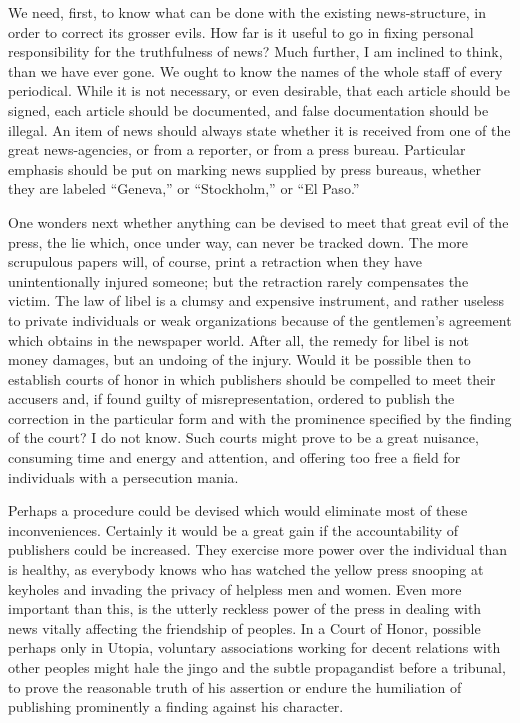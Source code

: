 \documentclass[openany,nobib,nohyper]{tufte-book}
\begin{document}
We need, first, to know what can be done with the existing
news-structure, in order to correct its grosser evils. How far is it
useful to go in fixing personal responsibility for the truthfulness of
news? Much further, I am inclined to think, than we have ever gone. We
ought to know the names of the whole staff of every periodical. While it
is not necessary, or even desirable, that each article should be signed,
each article should be documented, and false documentation should be
illegal. An item of news should always state whether it is received from
one of the great news-agencies, or from a reporter, or from a press
bureau. Particular emphasis should be put on marking news supplied by
press bureaus, whether they are labeled ``Geneva,'' or ``Stockholm,'' or
``El Paso.''

One wonders next whether anything can be devised to meet that great evil
of the press, the lie which, once under way, can never be tracked down.
The more scrupulous papers will, of course, print a retraction when they
have unintentionally injured someone; but the retraction rarely
compensates the victim. The law of libel is a clumsy and expensive
instrument, and rather useless to private individuals or weak
organizations because of the gentlemen's agreement which obtains in the
newspaper world. After all, the remedy for libel is not money damages,
but an undoing of the injury. Would it be possible then to establish
courts of honor in which publishers should be compelled to meet their
accusers and, if found guilty of misrepresentation, ordered to publish
the correction in the particular form and with the prominence specified
by the finding of the court? I do not know. Such courts might prove to
be a great nuisance, consuming time and energy and attention, and
offering too free a field for individuals with a persecution mania.

Perhaps a procedure could be devised which would eliminate most of these
inconveniences. Certainly it would be a great gain if the accountability
of publishers could be increased. They exercise more power over the
individual than is healthy, as everybody knows who has watched the
yellow press snooping at keyholes and invading the privacy of helpless
men and women. Even more important than this, is the utterly reckless
power of the press in dealing with news vitally affecting the friendship
of peoples. In a Court of Honor, possible perhaps only in Utopia,
voluntary associations working for decent relations with other peoples
might hale the jingo and the subtle propagandist before a tribunal, to
prove the reasonable truth of his assertion or endure the humiliation of
publishing prominently a finding against his character.
\end{document}
